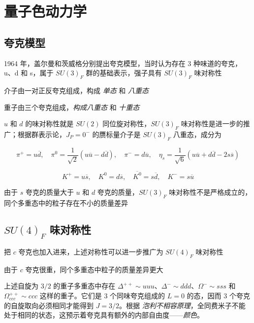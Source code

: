 \documentclass[oneside,a4paper,openany,11pt]{ctexbook}
\begin{document}
\section{量子色动力学}

\subsection{夸克模型}

1964 年，盖尔曼和茨威格分别提出夸克模型，当时认为存在 3 种味道的夸克，u、d 和 s，属于 $SU(3)_F$ 群的基础表示，强子具有 $SU(3)_F$ 味对称性

介子由一对正反夸克组成，构成 \emph{单态} 和 \emph{八重态}

重子由三个夸克组成，\emph{构成八重态} 和 \emph{十重态}

$u$ 和 $d$ 的味对称性就是 $SU(2)$ 同位旋对称性，$SU(3)_F$ 味对称性是进一步的推广；根据群表示论，$J_P = 0^-$ 的赝标量介子是 $SU(3)_F$ 八重态，成分为

\begin{equation}
    \pi^+ = u\overline{d}, \quad \pi^0 = \frac{1}{\sqrt{2}} (u\overline{u}-d\overline{d}), \quad \pi^- = d\overline{u}, \quad \eta_s = \frac{1}{\sqrt{6}} (u\overline{u}+d\overline{d}-2s\overline{s})
\end{equation}

\begin{equation}
    K^+ = u\overline{s}, \quad K^0 = d\overline{s}, \quad \overline{K^0} = s\overline{d}, \quad K^- = s\overline{u}
\end{equation}

由于 $s$ 夸克的质量大于 $u$ 和 $d$ 夸克的质量，$SU(3)_F$ 味对称性不是严格成立的，同个多重态中的粒子存在不小的质量差异

\subsection{\texorpdfstring{$SU(4)_F$}{SU(4)F} 味对称性}

把 $c$ 夸克也加入进来，上述对称性可以进一步推广为 $SU(4)_F$ 味对称性

由于 $c$ 夸克很重，同个多重态中粒子的质量差异更大

上述自旋为 $3/2$ 的重子多重态中存在 $\Delta^{++} \sim uuu$、$\Delta^- \sim ddd$、$\Omega^- \sim sss$ 和 $\Omega^{++}_{ccc} \sim ccc$ 这样的重子。它们是 $3$ 个同味夸克组成的 $L=0$ 的态，因而 $3$ 个夸克的自旋取向必须相同才能得到 $J=3/2$。根据 \emph{泡利不相容原理}，全同费米子不能处于相同的状态，这预示着夸克具有额外的内部自由度——\emph{颜色}。
\end{document}

